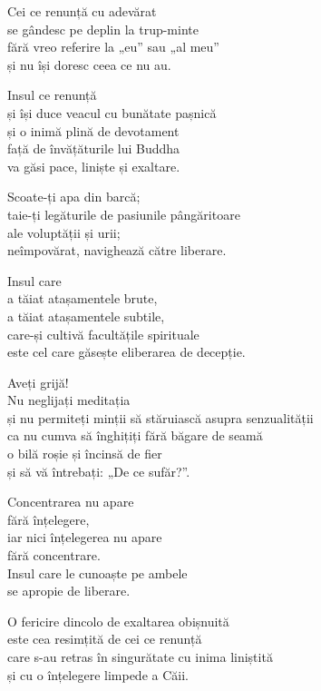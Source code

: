 Cei ce renunță cu adevărat\\
se gândesc pe deplin la trup-minte\\
fără vreo referire la „eu” sau „al meu”\\
și nu își doresc ceea ce nu au.


Insul ce renunță\\
și își duce veacul cu bunătate pașnică\\
și o inimă plină de devotament\\
față de învățăturile lui Buddha\\
va găsi pace, liniște și exaltare.


Scoate-ți apa din barcă;\\
taie-ți legăturile de pasiunile pângăritoare\\
ale voluptății și urii;\\
neîmpovărat, navighează către liberare.


Insul care\\
a tăiat atașamentele brute,\\
a tăiat atașamentele subtile,\\
care-și cultivă facultățile spirituale\\
este cel care găsește eliberarea de decepție.


Aveți grijă!\\
Nu neglijați meditația\\
și nu permiteți minții să stăruiască asupra senzualității\\
ca nu cumva să înghițiți fără băgare de seamă\\
o bilă roșie și încinsă de fier\\
și să vă întrebați: „De ce sufăr?”.


Concentrarea nu apare\\
fără înțelegere,\\
iar nici înțelegerea nu apare\\
fără concentrare.\\
Insul care le cunoaște pe ambele\\
se apropie de liberare.


O fericire dincolo de exaltarea obișnuită\\
este cea resimțită de cei ce renunță\\
care s-au retras în singurătate cu inima liniștită\\
și cu o înțelegere limpede a Căii.


